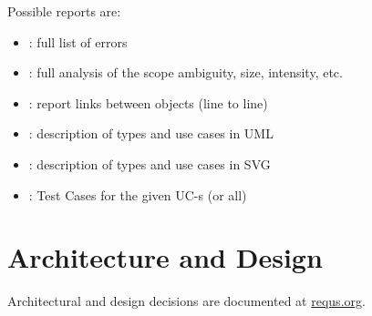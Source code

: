 \documentclass[12pt,oneside,letterpaper]{article}
\begin{document}
    Possible reports are:

    \begin{itemize}
        \item {}: full list of errors
        \item {}: full analysis of the scope ambiguity, size, intensity, etc.
        \item {}: report links between objects (line to line)
        \item {}: description of types and use cases in UML
        \item {}: description of types and use cases in SVG
        \item {}: Test Cases for the given UC-s (or all)
    \end{itemize}





\section{Architecture and Design}
\label{sec:design}

    Architectural and design decisions are documented at
    \href{http://www.requs.org}{requs.org}.





{}
\end{document}
